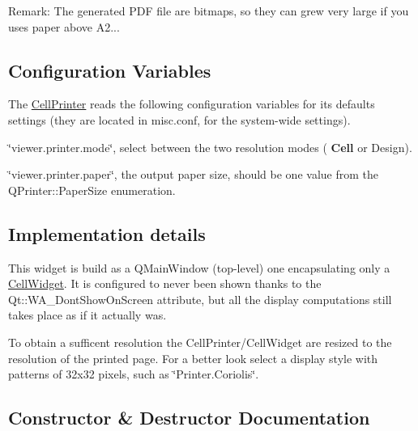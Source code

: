 \begin{DoxyParagraph}{Remark\+: The generated P\+DF file are bitmaps, so they can grew very large if}
you uses paper above A2...
\end{DoxyParagraph}
\hypertarget{classHurricane_1_1CellPrinter_secPrinterConfiguration}{}\subsection{Configuration Variables}\label{classHurricane_1_1CellPrinter_secPrinterConfiguration}
The \mbox{\hyperlink{classHurricane_1_1CellPrinter}{Cell\+Printer}} reads the following configuration variables for it\textquotesingle{}s defaults settings (they are located in {\ttfamily misc.\+conf}, for the system-\/wide settings). 
\begin{DoxyItemize}
\item {\ttfamily \char`\"{}viewer.\+printer.\+mode\char`\"{}}, select between the two resolution modes (\textbf{ Cell} or Design). 
\item {\ttfamily \char`\"{}viewer.\+printer.\+paper\char`\"{}}, the output paper size, should be one value from the Q\+Printer\+::\+Paper\+Size enumeration. 
\end{DoxyItemize}\hypertarget{classHurricane_1_1CellPrinter_secPrinterImplDetails}{}\subsection{Implementation details}\label{classHurricane_1_1CellPrinter_secPrinterImplDetails}
This widget is build as a Q\+Main\+Window (top-\/level) one encapsulating only a \mbox{\hyperlink{classHurricane_1_1CellWidget}{Cell\+Widget}}. It is configured to never been shown thanks to the {\ttfamily Qt\+::\+W\+A\+\_\+\+Dont\+Show\+On\+Screen} attribute, but all the display computations still takes place as if it actually was.

To obtain a sufficent resolution the Cell\+Printer/\+Cell\+Widget are resized to the resolution of the printed page. For a better look select a display style with patterns of 32x32 pixels, such as {\ttfamily \char`\"{}\+Printer.\+Coriolis\char`\"{}}. 

\subsection{Constructor \& Destructor Documentation}
\mbox{\label{classHurricane_1_1CellPrinter_a9f0d00e4832cdecb1bd4bf494b4072db}} 
